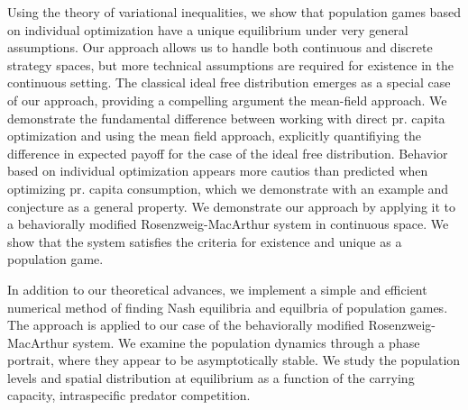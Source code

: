 Using the theory of variational inequalities, we show that population games based on individual optimization have a unique equilibrium under very general assumptions. Our approach allows us to handle both continuous and discrete strategy spaces, but more technical assumptions are required for existence in the continuous setting. The classical ideal free distribution emerges as a special case of our approach, providing a compelling argument the mean-field approach. We demonstrate the fundamental difference between working with direct pr. capita optimization and using the mean field approach, explicitly quantifiying the difference in expected payoff for the case of the ideal free distribution. Behavior based on individual optimization appears more cautios than predicted when optimizing pr. capita consumption, which we demonstrate with an example and conjecture as a general property. We demonstrate our approach by applying it to a behaviorally modified Rosenzweig-MacArthur system in continuous space. We show that the system satisfies the criteria for existence and unique as a population game.


In addition to our theoretical advances, we implement a simple and efficient numerical method of finding Nash equilibria and equilbria of population games. The approach is applied to our case of the behaviorally modified Rosenzweig-MacArthur system. We examine the population dynamics through a phase portrait, where they appear to be asymptotically stable. We study the population levels and spatial distribution at equilibrium as a function of the carrying capacity, intraspecific predator competition.





